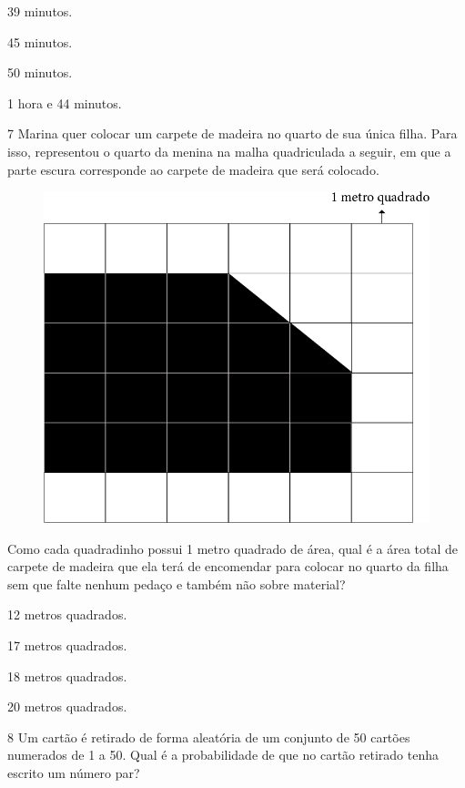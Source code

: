\begin{multicols}{2}
\begin{escolha}
\item
  39 minutos.
\item
  45 minutos.
\item
  50 minutos.
\item
  1 hora e 44 minutos.
\end{escolha}
\end{multicols}

\num{7} Marina quer colocar um carpete de madeira no quarto de sua única filha.
Para isso, representou o quarto da menina na malha quadriculada a seguir, em que a parte escura corresponde ao carpete de madeira que será
colocado.

\begin{figure}[htpb!]
\centering
\includegraphics[width=.5\textwidth]{media/image84.png}
\end{figure}

Como cada quadradinho possui 1 metro quadrado de área, qual é a área total
de carpete de madeira que ela terá de encomendar para colocar no quarto
da filha sem que falte nenhum pedaço e também não sobre material?

\begin{multicols}{2}
\begin{escolha}
\item
  12 metros quadrados.
\item
  17 metros quadrados.
\item
  18 metros quadrados.
\item
  20 metros quadrados.
\end{escolha}
\end{multicols}

\num{8} Um cartão é retirado de forma aleatória de um conjunto de 50 cartões
numerados de 1 a 50. Qual é a probabilidade de que no cartão retirado
tenha escrito um número par?


